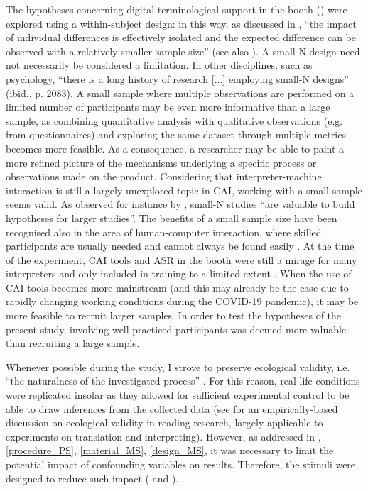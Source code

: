 The hypotheses concerning digital terminological support in the booth () were explored using a within-subject design: in this way, as discussed in \citet[65]{lazar_research_2017}, ``the impact of individual differences is effectively isolated and the expected difference can be observed with a relatively smaller sample size'' (see also ). A small-N design \citep{smith_smallN_2018} need not necessarily be considered a limitation. In other disciplines, such as psychology, ``there is a long history of research [...] employing small-N designs'' (ibid., p. 2083). A small sample where multiple observations are performed on a limited number of participants may be even more informative than a large sample, as combining quantitative analysis with qualitative observations (e.g. from questionnaires) and exploring the same dataset through multiple metrics becomes more feasible. As a consequence, a researcher may be able to paint a more refined picture of the mechanisms underlying a specific process or observations made on the product. Considering that in\-ter\-pret\-er-ma\-chine interaction is still a largely unexplored topic in CAI, working with a small sample seems valid. As observed for instance by \citet[422]{hansen-schirra_translation_2020}, small-N studies ``are valuable to build hypotheses for larger studies''. The benefits of a small sample size have been recognised also in the area of human-computer interaction, where skilled participants are usually needed and cannot always be found easily \citep[65]{lazar_research_2017}. At the time of the experiment, CAI tools and ASR in the booth were still a mirage for many interpreters and only included in training to a limited extent \citep{prandi_cai_2020}. When the use of CAI tools becomes more mainstream (and this may already be the case due to rapidly changing working conditions during the COVID-19 pandemic), it may be more feasible to recruit larger samples. In order to test the hypotheses of the present study, involving well-practiced participants was deemed more valuable than recruiting a large sample.

Whenever possible during the study, I strove to preserve ecological validity, i.e. ``the naturalness of the investigated process'' \citep[386]{hansen_thedialogue_2008}. For this reason, real-life conditions were replicated insofar as they allowed for sufficient experimental control to be able to draw inferences from the collected data (see \citealt{spinner_ecological_2013} for an empirically-based discussion on ecological validity in reading research, largely applicable to experiments on translation and interpreting). However, as addressed in , \ref{procedure_PS}, \ref{material_MS}, \ref{design_MS}, it was necessary to limit the potential impact of confounding variables on results. Therefore, the stimuli were designed to reduce such impact ( and ).

